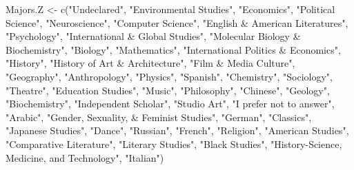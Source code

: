 \documentclass[
]{article}
\newenvironment{Shaded}{\begin{snugshade}}{\end{snugshade}}
\newcommand{\FunctionTok}[1]{\textcolor[rgb]{0.00,0.00,0.00}{#1}}
\newcommand{\NormalTok}[1]{#1}
\newcommand{\OtherTok}[1]{\textcolor[rgb]{0.56,0.35,0.01}{#1}}
\newcommand{\StringTok}[1]{\textcolor[rgb]{0.31,0.60,0.02}{#1}}
\begin{document}
\begin{Shaded}
\begin{Highlighting}[]
\NormalTok{Majors.Z }\OtherTok{\textless{}{-}} \FunctionTok{c}\NormalTok{(}\StringTok{"Undeclared"}\NormalTok{, }\StringTok{"Environmental Studies"}\NormalTok{, }\StringTok{"Economics"}\NormalTok{, }\StringTok{"Political Science"}\NormalTok{, }\StringTok{"Neuroscience"}\NormalTok{, }\StringTok{"Computer Science"}\NormalTok{, }\StringTok{"English \& American Literatures"}\NormalTok{, }\StringTok{"Psychology"}\NormalTok{, }\StringTok{"International \& Global Studies"}\NormalTok{, }\StringTok{"Molecular Biology \& Biochemistry"}\NormalTok{, }\StringTok{"Biology"}\NormalTok{, }\StringTok{"Mathematics"}\NormalTok{, }\StringTok{"International Politics \& Economics"}\NormalTok{, }\StringTok{"History"}\NormalTok{, }\StringTok{"History of Art \& Architecture"}\NormalTok{, }\StringTok{"Film \& Media Culture"}\NormalTok{, }\StringTok{"Geography"}\NormalTok{, }\StringTok{"Anthropology"}\NormalTok{, }\StringTok{"Physics"}\NormalTok{, }\StringTok{"Spanish"}\NormalTok{, }\StringTok{"Chemistry"}\NormalTok{, }\StringTok{"Sociology"}\NormalTok{, }\StringTok{"Theatre"}\NormalTok{, }\StringTok{"Education Studies"}\NormalTok{, }\StringTok{"Music"}\NormalTok{, }\StringTok{"Philosophy"}\NormalTok{, }\StringTok{"Chinese"}\NormalTok{, }\StringTok{"Geology"}\NormalTok{, }\StringTok{"Biochemistry"}\NormalTok{, }\StringTok{"Independent Scholar"}\NormalTok{, }\StringTok{"Studio Art"}\NormalTok{, }\StringTok{"I prefer not to answer"}\NormalTok{, }\StringTok{"Arabic"}\NormalTok{, }\StringTok{"Gender, Sexuality, \& Feminist Studies"}\NormalTok{, }\StringTok{"German"}\NormalTok{, }\StringTok{"Classics"}\NormalTok{, }\StringTok{"Japanese Studies"}\NormalTok{, }\StringTok{"Dance"}\NormalTok{, }\StringTok{"Russian"}\NormalTok{, }\StringTok{"French"}\NormalTok{, }\StringTok{"Religion"}\NormalTok{, }\StringTok{"American Studies"}\NormalTok{, }\StringTok{"Comparative Literature"}\NormalTok{, }\StringTok{"Literary Studies"}\NormalTok{, }\StringTok{"Black Studies"}\NormalTok{, }\StringTok{"History{-}Science, Medicine, and Technology"}\NormalTok{, }\StringTok{"Italian"}\NormalTok{)}


\end{Highlighting}
\end{Shaded}
\end{document}
